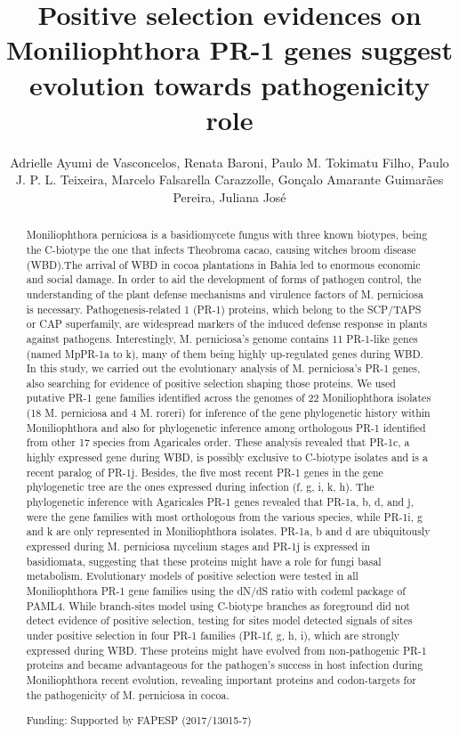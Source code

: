 \documentclass[twoside]{article}
\title{\vspace{-15mm}\fontsize{24pt}{10pt}\selectfont\textbf{ Positive selection evidences on Moniliophthora PR-1 genes suggest evolution towards pathogenicity role }} %
\author{ Adrielle Ayumi de Vasconcelos, Renata Baroni, Paulo M. Tokimatu Filho, Paulo J. P. L. Teixeira, Marcelo Falsarella Carazzolle, Gon\c{c}alo Amarante Guimar\~aes Pereira, Juliana Jos\'e }
\affil{ Institute of Biology; UNICAMP; Brazil }
\date{}
\begin{document}
  
  
  \maketitle %
  
  
  \thispagestyle{fancy} %
  
  
  \begin{abstract}
  Moniliophthora perniciosa is a basidiomycete fungus with three known biotypes,  being the C-biotype the one that  infects Theobroma cacao,  causing witches broom disease (WBD).The arrival of WBD in cocoa plantations in Bahia led to enormous economic and social damage. In order to aid the development of forms of pathogen control,  the understanding of the plant defense mechanisms and virulence factors of M. perniciosa is necessary. Pathogenesis-related 1 (PR-1) proteins,  which belong to the SCP/TAPS or CAP superfamily,  are widespread markers of the induced defense response in plants against pathogens. Interestingly,  M. perniciosa’s genome contains 11 PR-1-like genes (named MpPR-1a to k),  many of them being highly up-regulated genes during WBD. In this study,  we carried out the evolutionary analysis of M. perniciosa’s PR-1 genes,  also searching for evidence of positive selection shaping those proteins. We used putative PR-1 gene families identified across the genomes of 22 Moniliophthora isolates (18 M. perniciosa and 4 M. roreri) for inference of the gene phylogenetic history within Moniliophthora and also for phylogenetic inference among orthologous PR-1 identified from other 17 species from Agaricales order. These analysis revealed that PR-1c,  a highly expressed gene during WBD,  is possibly exclusive to C-biotype isolates and is a recent paralog of PR-1j. Besides,  the five most recent PR-1 genes in the gene phylogenetic tree are the ones expressed during infection (f, g, i, k, h). The phylogenetic inference with Agaricales PR-1 genes revealed that PR-1a,  b,  d,  and j,  were the gene families with most orthologous from the various species,  while PR-1i,  g and k are only represented in Moniliophthora isolates. PR-1a, b and d are ubiquitously expressed during M. perniciosa mycelium stages and PR-1j is expressed in basidiomata,  suggesting that these proteins might have a role for fungi basal metabolism. Evolutionary models of positive selection were tested in all Moniliophthora PR-1 gene families using the dN/dS ratio with codeml package of PAML4. While branch-sites model using C-biotype branches as foreground did not detect evidence of positive selection,  testing for sites model detected signals of sites under positive selection in four PR-1 families (PR-1f,  g,  h,  i),  which are strongly expressed during WBD. These proteins might have evolved from non-pathogenic PR-1 proteins and became advantageous for the pathogen’s success in host infection during Moniliophthora recent evolution,  revealing important proteins and codon-targets for the pathogenicity of M. perniciosa in cocoa.
  
  Funding: Supported by FAPESP (2017/13015-7) \\ 
  \end{abstract}
  
\end{document}
